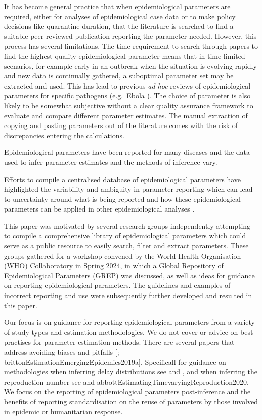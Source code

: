 \documentclass[
  10pt,
  letterpaper,
]{article}
\begin{document}
It has become general practice that when epidemiological parameters are
required, either for analyses of epidemiological case data or to make
policy decisions like quarantine duration, that the literature is
searched to find a suitable peer-reviewed publication reporting the
parameter needed. However, this process has several limitations. The
time requirement to search through papers to find the highest quality
epidemiological parameter means that in time-limited scenarios, for
example early in an outbreak when the situation is evolving rapidly and
new data is continually gathered, a suboptimal parameter set may be
extracted and used. This has lead to previous \emph{ad hoc} reviews of
epidemiological parameters for specific pathogens (e.g.~Ebola
\citep{vankerkhoveReviewEpidemiologicalParameters2015a}). The choice of
parameter is also likely to be somewhat subjective without a clear
quality assurance framework to evaluate and compare different parameter
estimates. The manual extraction of copying and pasting parameters out
of the literature comes with the risk of discrepancies entering the
calculations.

Epidemiological parameters have been reported for many diseases and the
data used to infer parameter estimates and the methods of inference
vary.

Efforts to compile a centralised database of epidemiological parameters
have highlighted the variability and ambiguity in parameter reporting
which can lead to uncertainty around what is being reported and how
these epidemiological parameters can be applied in other epidemiological
analyses
\citep{cuomo-dannenburgMarburgVirusDisease2024, doohanLassaFeverOutbreaks2024, nashEbolaVirusDisease2024}.

This paper was motivated by several research groups independently
attempting to compile a comprehensive library of epidemiological
parameters which could serve as a public resource to easily search,
filter and extract parameters. These groups gathered for a workshop
convened by the World Health Organisation (WHO) Collaboratory in Spring
2024, in which a Global Repository of Epidemiological Parameters (GREP)
was discussed, as well as ideas for guidance on reporting
epidemiological parameters. The guidelines and examples of incorrect
reporting and use were subsequently further developed and resulted in
this paper.

Our focus is on guidance for reporting epidemiological parameters from a
variety of study types and estimation methodologies. We do not cover or
advice on best practises for parameter estimation methods. There are
several papers that address avoiding biases and pitfalls
{[}\citet{kingAvoidableErrorsModelling2015};
brittonEstimationEmergingEpidemics2019a{]}. Specificall for guidance on
methodologies when inferring delay distributions see
\citet{parkEstimatingEpidemiologicalDelay2024} and
\citet{charnigaBestPracticesEstimating2024}, and when inferring the
reproduction number see
\citet{gosticPracticalConsiderationsMeasuring2020a} and
abbottEstimatingTimevaryingReproduction2020. We focus on the reporting
of epidemiological parameters post-inference and the benefits of
reporting standardisation on the reuse of parameters by those involved
in epidemic or humanitarian response.
\end{document}
